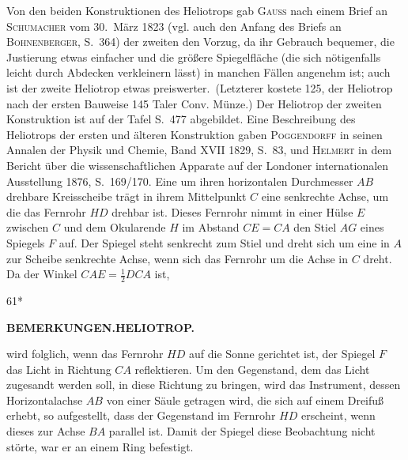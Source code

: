 Von den beiden Konstruktionen des Heliotrops gab \textsc{Gauss} nach einem Brief an \textsc{Schumacher} vom
30.~März 1823 (vgl. auch den Anfang des Briefs an \textsc{Bohnenberger}, S.~364) der zweiten den Vorzug, \glqq da
ihr Gebrauch bequemer, die Justierung etwas einfacher und die größere Spiegelfläche (die sich nötigenfalls
leicht durch Abdecken verkleinern lässt) in manchen Fällen angenehm ist; auch ist der zweite Heliotrop
etwas preiswerter.\grqq\ (Letzterer kostete 125, der Heliotrop nach der ersten Bauweise 145 Taler Conv.
Münze.) Der Heliotrop der zweiten Konstruktion ist auf der Tafel S.~477 abgebildet. Eine Beschreibung
des Heliotrops der ersten und älteren Konstruktion gaben \textsc{Poggendorff} in seinen Annalen der Physik
und Chemie, Band XVII 1829, S.~83, und \textsc{Helmert} in dem Bericht über die wissenschaftlichen Apparate
auf der Londoner internationalen Ausstellung 1876, S.~169/170. Eine um ihren horizontalen Durchmesser
$AB$ drehbare Kreisscheibe trägt in ihrem Mittelpunkt $C$ eine senkrechte Achse, um die das Fernrohr
$HD$ drehbar ist. Dieses Fernrohr nimmt in einer Hülse $E$ zwischen $C$ und dem Okularende $H$ im Abstand
$CE=CA$ den Stiel $AG$ eines Spiegels $F$ auf. Der Spiegel steht senkrecht zum Stiel und dreht sich um
eine in $A$ zur Scheibe senkrechte Achse, wenn sich das Fernrohr um die Achse in $C$ dreht.
Da der Winkel $CAE=\frac12 DCA$ ist,
\par\endgroup
\begin{center}
\end{center}
\vfill\noindent\hfill61*

\clearpage
\noindent{}\hfill{\small\textbf{BEMERKUNGEN.\quad HELIOTROP.}}\hfill\null\par\medskip
\begingroup\small
\noindent wird folglich, wenn das Fernrohr $HD$ auf die Sonne gerichtet ist, der Spiegel $F$ das Licht in
Richtung $CA$ reflektieren. Um den Gegenstand, dem das Licht zugesandt werden soll, in diese Richtung zu bringen,
wird das Instrument, dessen Horizontalachse $AB$ von einer Säule getragen wird, die sich auf einem Dreifuß erhebt,
so aufgestellt, dass der Gegenstand im Fernrohr $HD$ erscheint, wenn dieses zur Achse $BA$ parallel ist.
Damit der Spiegel diese Beobachtung nicht störte, war er an einem Ring befestigt.

